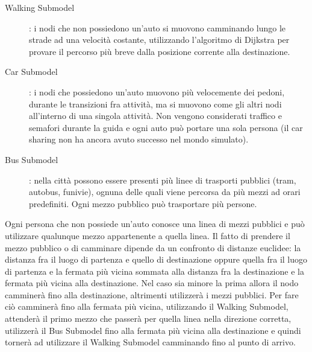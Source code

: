 \begin{description}
\item [Walking Submodel]: i nodi che non possiedono un'auto si muovono camminando lungo le strade ad una velocità costante, utilizzando l'algoritmo di Dijkstra per provare il percorso più breve dalla posizione corrente alla destinazione.
\item [Car Submodel]: i nodi che possiedono un'auto muovono più velocemente dei pedoni, durante le transizioni fra attività, ma si muovono come gli altri nodi all'interno di una singola attività. Non vengono considerati traffico e semafori durante la guida e ogni auto può portare una sola persona (il car sharing non ha ancora avuto successo nel mondo simulato).
\item [Bus Submodel]: nella città possono essere presenti più linee di trasporti pubblici (tram, autobus, funivie), ognuna delle quali viene percorsa da più mezzi ad orari predefiniti. Ogni mezzo pubblico può trasportare più persone.
\end{description}


Ogni persona che non possiede un'auto conosce una linea di mezzi pubblici e può utilizzare qualunque mezzo appartenente a quella linea. Il fatto di prendere il mezzo pubblico o di camminare dipende da un confronto di distanze euclidee: la distanza fra il luogo di partenza e quello di destinazione oppure quella fra il luogo di partenza e la fermata più vicina sommata alla distanza fra la destinazione e la fermata più vicina alla destinazione. Nel caso sia minore la prima allora il nodo camminerà fino alla destinazione, altrimenti utilizzerà i mezzi pubblici. Per fare ciò camminerà fino alla fermata più vicina, utilizzando il Walking Submodel, attenderà il primo mezzo che passerà per quella linea nella direzione corretta, utilizzerà il Bus Submodel fino alla fermata più vicina alla destinazione e quindi tornerà ad utilizzare il Walking Submodel camminando fino al punto di arrivo.
 

